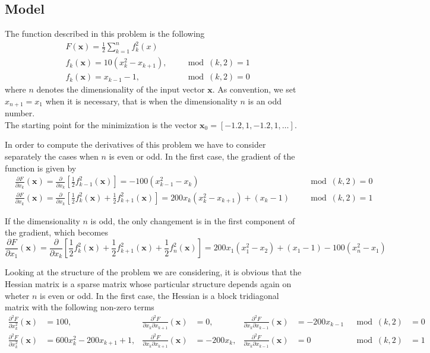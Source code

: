 \subsection*{Model}
The function described in this problem is the following
\begin{equation*}
    \begin{aligned}
    & F(\mathbf{x}) = \frac{1}{2} \sum_{k=1}^{n} f_k^2(x) \\
    & f_k(\mathbf{x}) = 10 \left(x_k^2 - x_{k+1}\right), \quad  & \mod (k,2) = 1\\   
    & f_k(\mathbf{x}) = x_{k-1} -1, \quad & \mod(k,2) = 0
    \end{aligned}
\end{equation*}
where $n$ denotes the dimensionality of the input vector $\mathbf{x}$. As convention, we set $x_{n+1} = x_1$ when it is necessary, that is when the dimensionality $n$ is an odd number.
\\ The starting point for the minimization is the vector $\mathbf{x}_0 = [-1.2, 1, -1.2, 1, \ldots]$.

In order to compute the derivatives of this problem we have to consider separately the cases when $n$ is even or odd. In the first case, the gradient of the function is given by
\begin{align*}
    &\frac{\partial F}{\partial x_k} (\mathbf{x}) = \frac{\partial}{\partial x_k} \left[\frac{1}{2} f_{k-1}^2(\mathbf{x})\right] = - 100 (x_{k-1}^2 - x_k) \quad & \mod(k,2) = 0 \\
    & \frac{\partial F}{\partial x_k} (\mathbf{x}) = \frac{\partial}{\partial x_k} \left[\frac{1}{2} f_{k}^2(\mathbf{x}) + \frac{1}{2} f_{k+1}^2(\mathbf{x})\right] = 200x_k (x_k^2 - x_{k+1}) + (x_k -1)\quad & \mod(k,2) = 1
\end{align*}

If the dimensionality $n$ is odd, the only changement is in the first component of the gradient, which becomes
$$ \frac{\partial F}{\partial x_1} (\mathbf{x})  = \frac{\partial}{\partial x_k} \left[\frac{1}{2} f_{k}^2(\mathbf{x}) + \frac{1}{2} f_{k+1}^2(\mathbf{x}) + \frac{1}{2}f_n^2(\mathbf{x}) \right] = 200x_1 (x_1^2 - x_{2}) + (x_1 -1)  - 100(x_n^2 - x_1)$$

Looking at the structure of the problem we are considering, it is obvious that the Hessian matrix is a sparse matrix whose particular structure depends again on wheter $n$ is even or odd. In the first case, the Hessian is a block tridiagonal matrix with the following non-zero terms
\begin{align*}
    \frac{\partial^2 F}{\partial x_k^2} (\mathbf{x}) &= 100, & \frac{\partial^2 F}{\partial x_k \partial x_{k+1}} (\mathbf{x}) &= 0, & \frac{\partial^2 F}{\partial x_k \partial x_{k-1}} (\mathbf{x}) &= -200x_{k-1} & \mod(k,2) &= 0 \\
    \frac{\partial^2 F}{\partial x_k^2} (\mathbf{x}) &= 600x_k^2 - 200x_{k+1} + 1, & \frac{\partial^2 F}{\partial x_k \partial x_{k+1}} (\mathbf{x}) &= -200x_k, & \frac{\partial^2 F}{\partial x_k \partial x_{k-1}} (\mathbf{x}) &= 0 & \mod(k,2) &= 1 \\
\end{align*}

